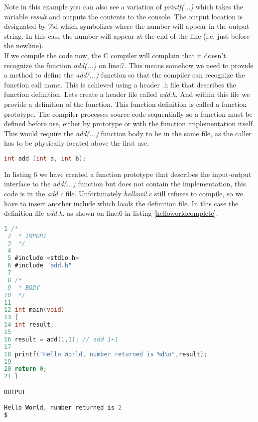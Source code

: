 Note in this example you can also see a variation of \textit{printf(...)} which takes the variable \textit{result} and outputs the contents to the console. The output location is designated by \%d which symbolizes where the number will appear in the output string. In this case the number will appear at the end of the line (i.e. just before the newline).\\

If we compile the code now, the C compiler will complain that it doesn't recognize the function \textit{add(...)} on line:7. This means somehow we need to provide a method to define the \textit{add(...)} function so that the compiler can recognize the function call name. This is achieved using a header .h file that describes the function definition. Lets create a header file called \textit{add.h}. And within this file we provide a definition of the function. This function definition is called a function prototype. The compiler processes source code sequentially so a function must be defined before use, either by prototype or with the function implementation itself. This would require the \textit{add(...)} function body to be in the same file, as the caller has to be physically located above the first use.

\begin{lstlisting}[language=C,caption={File add.h, header file},captionpos=b]  
int add (int a, int b);
\end{lstlisting}

In listing 6 we have created a function prototype that describes the input-output interface to the \textit{add(...)} function but does not contain the implementation, this code is in the \textit{add.c} file. Unfortunately \textit{hellow2.c} still refuses to compile, so we have to insert another include which loads the definition file. In this case the definition file \textit{add.h}, as shown on line:6 in listing \ref{helloworldcomplete}.\\

\begin{lstlisting}[language=C,showstringspaces=false,caption={File hellow3.c, complete},captionpos=b,label=helloworldcomplete]   
 1 /*
 2  * IMPORT
 3  */
 4
 5 #include <stdio.h>
 6 #include "add.h"
 7
 8 /*
 9  * BODY
10  */
11
12 int main(void)
13 {
14 int result;
15
16 result = add(1,1); // add 1+1
17
18 printf("Hello World, number returned is %d\n",result);
19
20 return 0;
21 }

OUTPUT

Hello World, number returned is 2
$

\end{lstlisting}
 
